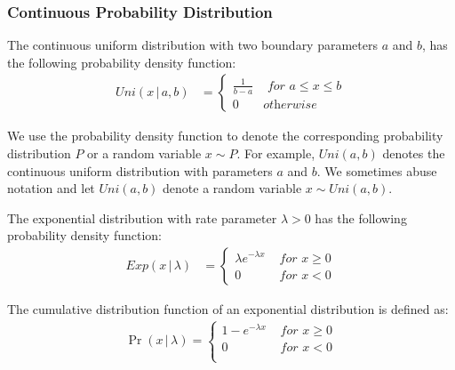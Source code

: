 \subsubsection{Continuous Probability Distribution}
\label{subsubsec:ContinuousProbabilityDistribution}

\begin{definition}
    \label{def:UniformDistribution}
    The continuous uniform distribution with two boundary parameters $a$ and $b$, has the following probability density function:
    \begin{equation}
        \begin{split}
            Uni\left(x \,|\,a,b\right)
            &=
            \begin{cases}
                \frac{1}{b-a} & \textit{ for } a\leq x\leq b \\
                0             & \textit{otherwise}
            \end{cases}
        \end{split}
    \end{equation}
\end{definition}

We use the probability density function to denote the corresponding probability distribution $P$ or a random variable $x \sim P$. For example, $Uni\left(a,b\right)$ denotes the continuous uniform distribution with parameters $a$ and $b$. We sometimes abuse notation and let $Uni\left( a,b\right)$ denote a random variable $x \sim Uni\left( a,b\right)$.


\begin{definition}
    \label{def:ExponentialDistribution}
    The exponential distribution with rate parameter $\lambda>0$ has the following probability density function:
    \begin{equation}
        \begin{split}
            Exp\left(x \,|\,\lambda\right)            &=
            \begin{cases}
                \lambda e^{-\lambda x } & \textit{ for }  x\geq 0 \\
                0                       & \textit{ for }  x <0
            \end{cases}
        \end{split}
    \end{equation}
\end{definition}
The cumulative distribution function of an exponential distribution is defined as:
\begin{equation}
    \begin{split}
        \Pr\left( x\,|\,\lambda\right)=
        \begin{cases}
            1- e^{-\lambda x} & \textit{ for } x \geq 0 \\
            0                 & \textit{ for } x < 0    \\
        \end{cases}
    \end{split}
\end{equation}


